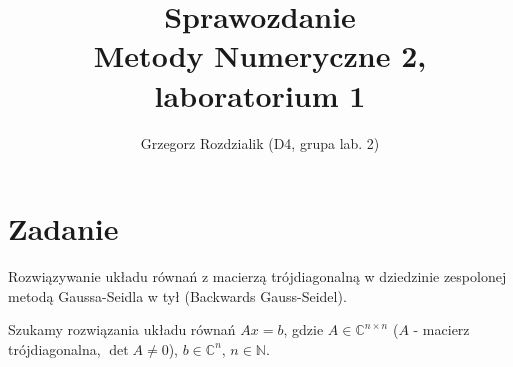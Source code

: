 \documentclass[12pt]{article}
\begin{document}
	\title{Sprawozdanie\\Metody Numeryczne 2, laboratorium 1}
	\author{Grzegorz Rozdzialik (D4, grupa lab. 2)}
	\maketitle	

	\section{Zadanie}
	Rozwiązywanie układu równań z macierzą trójdiagonalną w dziedzinie zespolonej metodą Gaussa-Seidla w tył (Backwards Gauss-Seidel).
	
	Szukamy rozwiązania układu równań $Ax = b$, gdzie
	$A \in \mathbb{C}^{n \times n}$ ($A$ - macierz trójdiagonalna, $\det{A} \neq 0$),
	$b \in \mathbb{C}^{n}$,
	$n \in \mathbb{N}$.
	
\end{document}
